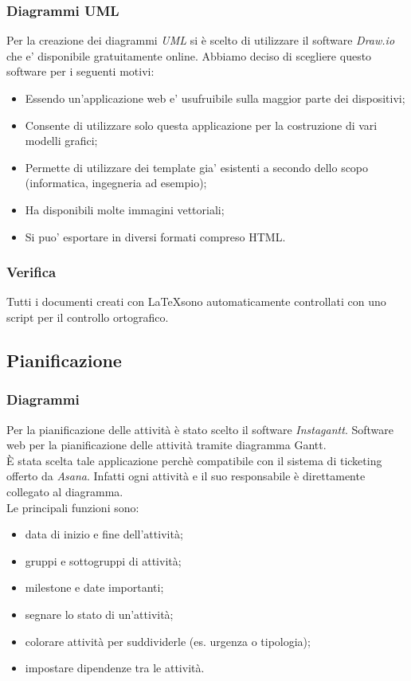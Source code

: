 \documentclass[12pt,a4paper,titlepage]{article}
\begin{document}
\subsubsection{Diagrammi UML}
Per la creazione dei diagrammi \textit{UML} si è scelto di utilizzare il software \textit{Draw.io} che e' disponibile gratuitamente online. Abbiamo deciso di scegliere questo software per i seguenti motivi:
	\begin{itemize}
		\item Essendo un'applicazione web e' usufruibile sulla maggior parte dei dispositivi;
		\item Consente di utilizzare solo questa applicazione per la costruzione di vari modelli grafici;
		\item Permette di utilizzare dei template gia' esistenti a secondo dello scopo (informatica, ingegneria ad esempio);
		\item Ha disponibili molte immagini vettoriali;
		\item Si puo' esportare in diversi formati compreso HTML.
	\end{itemize}	 
\subsubsection{Verifica}
Tutti i documenti creati con \LaTeX sono automaticamente controllati con uno script per il controllo ortografico.
\subsection{Pianificazione}
\subsubsection{Diagrammi}
Per la pianificazione delle attività è stato scelto il software \textit{Instagantt}. Software web per la pianificazione delle attività tramite diagramma Gantt. \\
È stata scelta tale applicazione perchè compatibile con il sistema di ticketing offerto da \textit{Asana}. Infatti ogni attività e il suo responsabile è direttamente collegato al diagramma. \\
Le principali funzioni sono:
\begin{itemize}
	\item data di inizio e fine dell'attività;
	\item gruppi e sottogruppi di attività;
	\item milestone e date importanti;
	\item segnare lo stato di un'attività;
	\item colorare attività per suddividerle (es. urgenza o tipologia);
	\item impostare dipendenze tra le attività.
\end{itemize}
\end{document}
